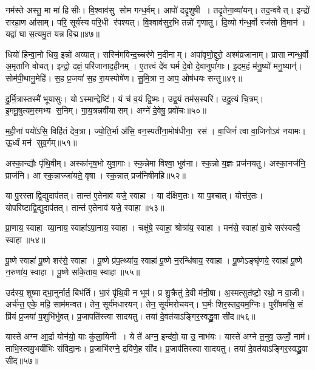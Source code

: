 नम॑स्ते अस्तु॒ मा मा॑ हिसीः। वि॒श्वाव॑सु सोम गन्ध॒र्वम्। आपो॑ ददृ॒शुषी। तदृ॒तेना॒व्या॑यन्। तद॒न्ववैत्। इन्द्रो॑ रारहा॒ण आ॑साम्। परि॒ सूर्य॑स्य परि॒धी र॑पश्यत्। वि॒श्वाव॑सुर॒भि तन्नो॑ गृणातु। दि॒व्यो ग॑न्ध॒र्वो रज॑सो वि॒मान॑। यद्वा॑ घा स॒त्यमु॒त यन्न वि॒द्म॥४७॥

धियो॑ हिन्वा॒नो धिय॒ इन्नो॑ अव्यात्। सस्नि॑मविन्द॒च्चर॑णे न॒दीनाम्। अपा॑वृणो॒द्दुरो॒ अश्म॑व्रजानाम्। प्रासान्गन्ध॒र्वो अ॒मृता॑नि वोचत्। इन्द्रो॒ दक्षं॒ परि॑जानाद॒हीनम्। ए॒तत्त्वं दे॑व घर्म दे॒वो दे॒वानुपा॑गाः। इ॒दम॒हं म॑नु॒ष्यो॑ मनु॒ष्यान्॑। सोम॑पी॒थानु॒मेहि॑। स॒ह प्र॒जया॑ स॒ह रा॒यस्पोषे॑ण। सु॒मि॒त्रा न॒ आप॒ ओष॑धयः सन्तु॥४९॥

दु॒र्मि॒त्रास्तस्मै॑ भूयासुः। योऽस्मान्द्वेष्टि॑। यं च॑ व॒यं द्वि॒ष्मः। उद्व॒यं तम॑स॒स्परि॑। उदु॒त्यं चि॒त्रम्। इ॒ममू॒षुत्यम॒स्मभ्य स॒निम्। गा॒य॒त्रन्नवी॑यासम्। अग्ने॑ दे॒वेषु॒ प्रवो॑चः॥५०॥
\anuvakamend[याऽऽग्नीध्रे॒ तान्त॑ ए॒तेनाव॑ यजे॒ स्वाहा॒ धर्म॑णा शं॒ युधा॑याः प्यासिषी॒महि॒ पोषे॑ण॒ निष॑त्तो वि॒द्म स॑न्त्व॒ष्टौ]

म॒ही॒नां पयो॑ऽसि॒ विहि॑तं देव॒त्रा। ज्यो॒ति॒र्भा अ॑सि॒ वन॒स्पती॑ना॒\-मोष॑धीना॒ रस॑। वा॒जिनं॑ त्वा वा॒जिनोऽव॑ नयामः। ऊ॒र्ध्वं मन॑ सुव॒र्गम्॥५१॥
\anuvakamend

अस्का॒न्द्यौः पृ॑थि॒वीम्। अस्का॑नृष॒भो युवा॒गाः। स्क॒न्नेमा विश्वा॒ भुव॑ना। स्क॒न्नो य॒ज्ञः प्रज॑नयतु। अस्का॒नज॑नि॒ प्राज॑नि। आ स्क॒न्नाज्जा॑यते॒ वृषा। स्क॒न्नात् प्रज॑निषीमहि॥५२॥
\anuvakamend

या पु॒रस्ताद्वि॒द्युदाप॑तत्। तान्त॑ ए॒तेनाव॑ यजे॒ स्वाहा। या द॑क्षिण॒तः। या प॒श्चात्। योत्त॑र॒तः। योपरि॑ष्टाद्वि॒द्युदाप॑तत्। तान्त॑ ए॒तेनाव॑ यजे॒ स्वाहा॥५३॥
\anuvakamend

प्रा॒णाय॒ स्वाहा व्या॒नाय॒ स्वाहा॑ऽपा॒नाय॒ स्वाहा। चक्षु॑षे॒ स्वाहा॒ श्रोत्रा॑य॒ स्वाहा। मन॑से॒ स्वाहा॑ वा॒चे सर॑स्वत्यै॒ स्वाहा॥५४॥
\anuvakamend

पू॒ष्णे स्वाहा॑ पू॒ष्णे शर॑से॒ स्वाहा। पू॒ष्णे प्र॑प॒त्थ्या॑य॒ स्वाहा॑ पू॒ष्णे न॒रन्धि॑षाय॒ स्वाहा। पू॒ष्णेऽङ्घृ॑णये॒ स्वाहा॑ पू॒ष्णे न॒रुणा॑य॒ स्वाहा। पू॒ष्णे सा॑के॒ताय॒ स्वाहा॥५५॥
\anuvakamend


उद॑स्य॒ शुष्माद्भा॒नुर्नार्त॒ बिभ॑र्ति। भा॒रं पृ॑थि॒वी न भूम॑। प्र शु॒क्रैतु॑ दे॒वी म॑नी॒षा। अ॒स्मत्सुत॑ष्टो॒ रथो॒ न वा॒जी। अर्च॑न्त॒ एके॒ महि॒ साम॑मन्वत। तेन॒ सूर्य॑मधारयन्। तेन॒ सूर्य॑मरोचयन्। घ॒र्मः  शिर॒स्तद॒यम॒ग्निः। पुरी॑षमसि॒ सं प्रि॑यं प्र॒जया॑ प॒शुभि॑र्भुवत्। प्र॒जापति॑स्त्वा सादयतु। तया॑ दे॒वत॑याऽङ्गिर॒स्वद्ध्रु॒वा सी॑द॥५६॥
\anuvakamend

यास्ते॑ अग्न आ॒र्द्रा योन॑यो॒ याः कु॑ला॒यिनी। ये ते॑ अग्न॒ इन्द॑वो॒ या उ॒ नाभ॑यः। यास्ते॑ अग्ने त॒नुव॒ ऊर्जो॒ नाम॑। ताभि॒स्त्वमु॒भयी॑भिः संविदा॒नः। प्र॒जाभि॑रग्ने॒ द्रवि॑णे॒ह सी॑द। प्र॒जाप॑तिस्त्वा सादयतु। तया॑ दे॒वत॑याऽङ्गिर॒स्वद्ध्रु॒वा सी॑द॥५७॥
\anuvakamend

